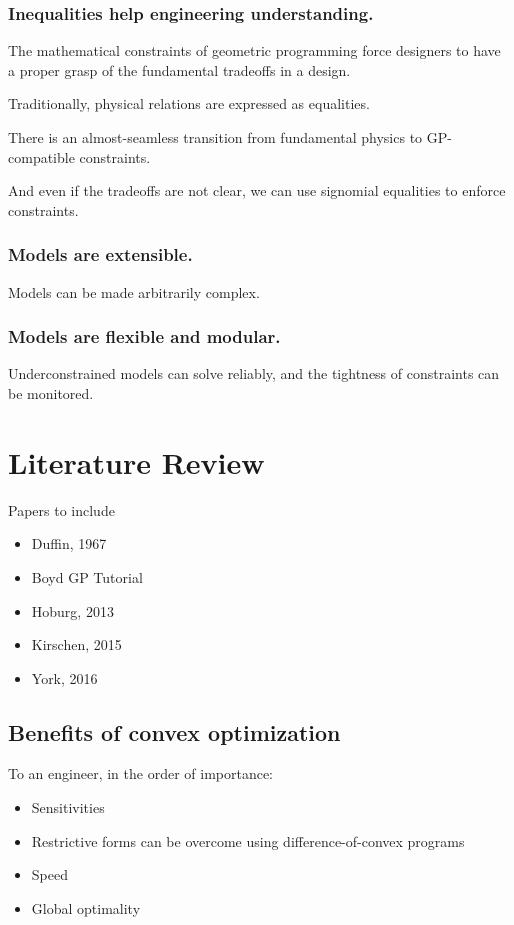 \documentclass{aiaa-pretty}
\begin{document}
\subsubsection{Inequalities help engineering understanding.}
The mathematical constraints of geometric programming force designers to have a proper grasp of the fundamental tradeoffs in a design.

Traditionally, physical relations are expressed as equalities.  

There is an almost-seamless transition from fundamental physics to GP-compatible constraints.

And even if the tradeoffs are not clear, we can use signomial equalities to enforce constraints. 

\subsubsection{Models are extensible.}
Models can be made arbitrarily complex.
\subsubsection{Models are flexible and modular.}
Underconstrained models can solve reliably, and the tightness of constraints can be monitored. 
	
\section{Literature Review}
Papers to include
\begin{itemize}
\item Duffin, 1967
\item Boyd GP Tutorial
\item Hoburg, 2013
\item Kirschen, 2015
\item York, 2016
\end{itemize}
\subsection{Benefits of convex optimization}
To an engineer, in the order of importance:
\begin{itemize}
\item Sensitivities
\item Restrictive forms can be overcome using difference-of-convex programs
\item Speed
\item Global optimality
\end{itemize}
\end{document}

